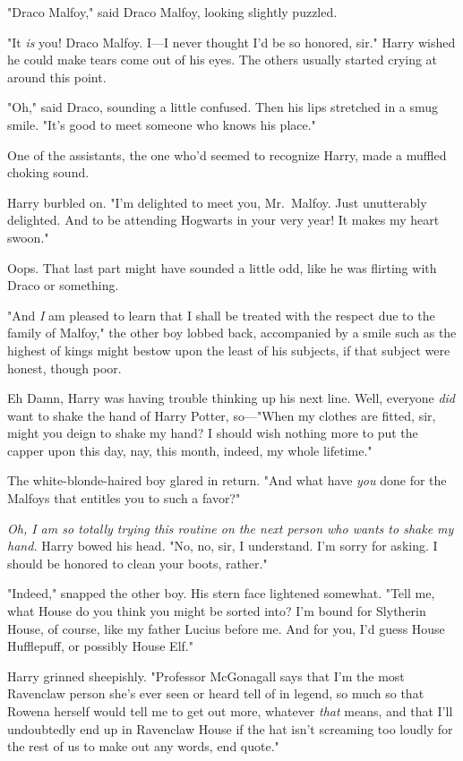 "Draco Malfoy," said Draco Malfoy, looking slightly puzzled.

"It \emph{is} you! Draco Malfoy. I—I never thought I'd be so honored, sir."
Harry wished he could make tears come out of his eyes. The others usually
started crying at around this point.

"Oh," said Draco, sounding a little confused. Then his lips stretched in a smug
smile. "It's good to meet someone who knows his place."

One of the assistants, the one who'd seemed to recognize Harry, made a muffled
choking sound.

Harry burbled on. "I'm delighted to meet you, Mr.~Malfoy. Just unutterably
delighted. And to be attending Hogwarts in your very year! It makes my heart
swoon."

Oops. That last part might have sounded a little odd, like he was flirting with
Draco or something.

"And \emph{I} am pleased to learn that I shall be treated with the respect due
to the family of Malfoy," the other boy lobbed back, accompanied by a smile
such as the highest of kings might bestow upon the least of his subjects, if
that subject were honest, though poor.

Eh{\el} Damn, Harry was having trouble thinking up his next line. Well,
everyone \emph{did} want to shake the hand of Harry Potter, so—"When my
clothes are fitted, sir, might you deign to shake my hand? I should wish
nothing more to put the capper upon this day, nay, this month, indeed, my whole
lifetime."

The white-blonde-haired boy glared in return. "And what have \emph{you} done
for the Malfoys that entitles you to such a favor?"

\emph{Oh, I am so totally trying this routine on the next person who wants to
shake my hand.} Harry bowed his head. "No, no, sir, I understand. I'm sorry for
asking. I should be honored to clean your boots, rather."

"Indeed," snapped the other boy. His stern face lightened somewhat. "Tell me,
what House do you think you might be sorted into? I'm bound for Slytherin
House, of course, like my father Lucius before me. And for you, I'd guess House
Hufflepuff, or possibly House Elf."

Harry grinned sheepishly. "Professor McGonagall says that I'm the most
Ravenclaw person she's ever seen or heard tell of in legend, so much so that
Rowena herself would tell me to get out more, whatever \emph{that} means, and
that I'll undoubtedly end up in Ravenclaw House if the hat isn't screaming too
loudly for the rest of us to make out any words, end quote."

